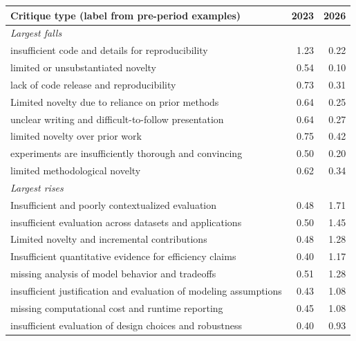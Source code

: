 \begin{tabular}{lrr}
\toprule
Critique type (label from pre-period examples) & 2023 & 2026 \\
\midrule
\multicolumn{3}{l}{\emph{Largest falls}} \\
insufficient code and details for reproducibility & 1.23 & 0.22 \\
limited or unsubstantiated novelty & 0.54 & 0.10 \\
lack of code release and reproducibility & 0.73 & 0.31 \\
Limited novelty due to reliance on prior methods & 0.64 & 0.25 \\
unclear writing and difficult-to-follow presentation & 0.64 & 0.27 \\
limited novelty over prior work & 0.75 & 0.42 \\
experiments are insufficiently thorough and convincing & 0.50 & 0.20 \\
limited methodological novelty & 0.62 & 0.34 \\
\multicolumn{3}{l}{\emph{Largest rises}} \\
Insufficient and poorly contextualized evaluation & 0.48 & 1.71 \\
insufficient evaluation across datasets and applications & 0.50 & 1.45 \\
Limited novelty and incremental contributions & 0.48 & 1.28 \\
Insufficient quantitative evidence for efficiency claims & 0.40 & 1.17 \\
missing analysis of model behavior and tradeoffs & 0.51 & 1.28 \\
insufficient justification and evaluation of modeling assumptions & 0.43 & 1.08 \\
missing computational cost and runtime reporting & 0.45 & 1.08 \\
insufficient evaluation of design choices and robustness & 0.40 & 0.93 \\
\bottomrule
\end{tabular}

